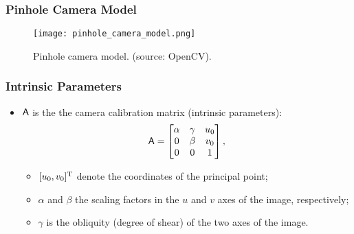 \documentclass{beamer}
\begin{document}
		\begin{frame}\frametitle{Pinhole Camera Model}
			\begin{figure}[htb!]
				\center
				\texttt{[image: pinhole\_camera\_model.png]}
				\label{fig:keypts_1} %
				\caption{Pinhole camera model. (source: OpenCV).}
				\vspace{-3.5mm}
				\label{fig:undistort}
			\end{figure}
		\end{frame}


		\begin{frame}\frametitle{Intrinsic Parameters}
			\begin{itemize}
			 \item $\mathsf{A}$ is the the camera calibration matrix (intrinsic parameters):
			 \begin{equation*}
			\mathsf{A} =
			\begin{bmatrix}
			\alpha & \gamma & u_0\\
			0 & \beta  & v_0\\
			0 &     0  & 1\\
			\end{bmatrix},
			\end{equation*}
			\begin{itemize}
			 \item $[u_0,v_0]^{\mathrm{T}}$ denote the coordinates of the principal point;
			 \item $\alpha$ and $\beta$ the scaling factors in the $ u $ and $ v $ axes of the image, respectively;
			 \item $\gamma$ is the obliquity (degree of shear) of the two axes of the image.
			\end{itemize}
			\end{itemize}
		\end{frame}
\end{document}
